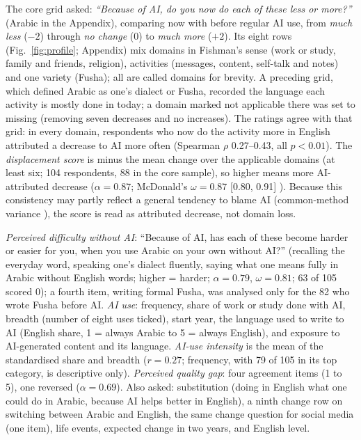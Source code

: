 \documentclass[conference]{IEEEtran}
\begin{document}
The core grid asked: \emph{``Because of AI, do you now do each of these less or more?''} (Arabic in the Appendix), comparing now with before regular AI use, from \emph{much less} ($-2$) through \emph{no change} (0) to \emph{much more} ($+2$). Its eight rows (Fig.~\ref{fig:profile}; Appendix) mix domains in Fishman's sense (work or study, family and friends, religion), activities (messages, content, self-talk and notes) and one variety (Fusha); all are called domains for brevity. A preceding grid, which defined Arabic as one's dialect or Fusha, recorded the language each activity is mostly done in today; a domain marked not applicable there was set to missing (removing seven decreases and no increases). The ratings agree with that grid: in every domain, respondents who now do the activity more in English attributed a decrease to AI more often (Spearman $\rho$ 0.27--0.43, all $p<0.01$). The \emph{displacement score} is minus the mean change over the applicable domains (at least six; 104 respondents, 88 in the core sample), so higher means more AI-attributed decrease ($\alpha=0.87$; McDonald's $\omega=0.87$ [0.80, 0.91] \cite{dunn2014}). Because this consistency may partly reflect a general tendency to blame AI (common-method variance \cite{podsakoff2003}), the score is read as attributed decrease, not domain loss.

\emph{Perceived difficulty without AI}: ``Because of AI, has each of these become harder or easier for you, when you use Arabic on your own without AI?'' (recalling the everyday word, speaking one's dialect fluently, saying what one means fully in Arabic without English words; higher = harder; $\alpha=0.79$, $\omega=0.81$; 63 of 105 scored 0); a fourth item, writing formal Fusha, was analysed only for the 82 who wrote Fusha before AI. \emph{AI use}: frequency, share of work or study done with AI, breadth (number of eight uses ticked), start year, the language used to write to AI (English share, 1 = always Arabic to 5 = always English), and exposure to AI-generated content and its language. \emph{AI-use intensity} is the mean of the standardised share and breadth ($r=0.27$; frequency, with 79 of 105 in its top category, is descriptive only). \emph{Perceived quality gap}: four agreement items (1 to 5), one reversed ($\alpha=0.69$). Also asked: substitution (doing in English what one could do in Arabic, because AI helps better in English), a ninth change row on switching between Arabic and English, the same change question for social media (one item), life events, expected change in two years, and English level.
\end{document}
